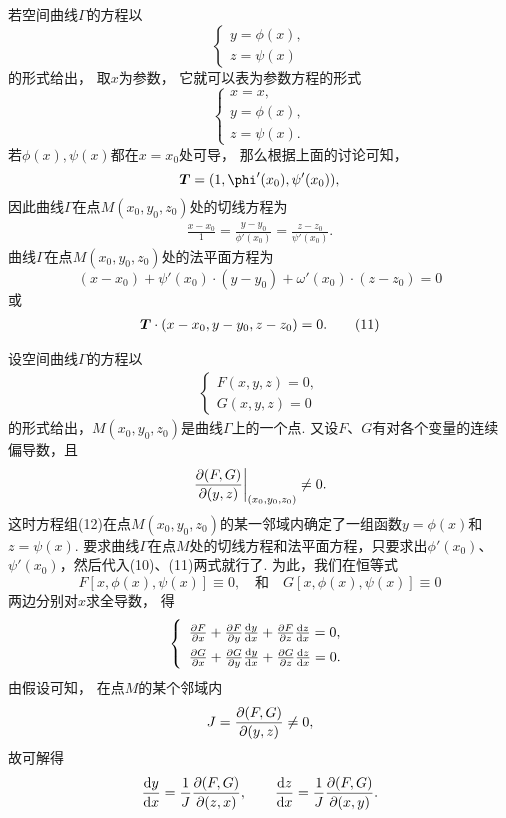 若空间曲线\(\Gamma\)的方程以\[
	\left\{ \begin{array}{l}
		y = \phi(x), \\
		z = \psi(x)
	\end{array} \right.
\]的形式给出，
取\(x\)为参数，
它就可以表为参数方程的形式\[
	\left\{ \begin{array}{l}
		x = x, \\
		y = \phi(x), \\
		z = \psi(x).
	\end{array} \right.
\]
若\(\phi(x),\psi(x)\)都在\(x=x_0\)处可导，
那么根据上面的讨论可知，\[
	\vb{T} = (1,\phi'(x_0),\psi'(x_0)),
\]
因此曲线\(\Gamma\)在点\(M(x_0,y_0,z_0)\)处的切线方程为
\begin{gather}
	\frac{x-x_0}{1}
	=\frac{y-y_0}{\phi'(x_0)}
	=\frac{z-z_0}{\psi'(x_0)}.
	\tag{10}
\end{gather}
曲线\(\Gamma\)在点\(M(x_0,y_0,z_0)\)处的法平面方程为\[
	(x-x_0) + \psi'(x_0) \cdot (y-y_0) + \omega'(x_0) \cdot (z-z_0) = 0
\]或\begin{gather}
	\boldsymbol{T}\cdot(x-x_0,y-y_0,z-z_0)=0.
	\tag{11}
\end{gather}

设空间曲线\(\Gamma\)的方程以\begin{gather}
\left\{ \begin{array}{l}
F(x,y,z)=0, \\
G(x,y,z)=0
\end{array} \right.
\tag{12}
\end{gather}的形式给出，\(M(x_0,y_0,z_0)\)是曲线\(\Gamma\)上的一个点.
又设\(F\)、\(G\)有对各个变量的连续偏导数，且\[
\eval{\jacobi{F,G}{y,z}}_{(x_0,y_0,z_0)} \neq 0.
\]这时方程组(12)在点\(M(x_0,y_0,z_0)\)的某一邻域内确定了一组函数\(y=\phi(x)\)和\(z=\psi(x)\).
要求曲线\(\Gamma\)在点\(M\)处的切线方程和法平面方程，只要求出\(\phi'(x_0)\)、\(\psi'(x_0)\)，然后代入(10)、(11)两式就行了.
为此，我们在恒等式\[
	F[x,\phi(x),\psi(x)] \equiv 0,
	\quad\text{和}\quad
	G[x,\phi(x),\psi(x)] \equiv 0
\]两边分别对\(x\)求全导数，
得\[
	\left\{ \def\arraystretch{1.5} \begin{array}{l}
		\pdv{F}{x} + \pdv{F}{y} \dv{y}{x} + \pdv{F}{z} \dv{z}{x} = 0, \\
		\pdv{G}{x} + \pdv{G}{y} \dv{y}{x} + \pdv{G}{z} \dv{z}{x} = 0.
	\end{array} \right.
\]
由假设可知，
在点\(M\)的某个邻域内\[
	J = \pdv{ (F,G) }{ (y,z) } \neq 0,
\]
故可解得\[
	\dv{y}{x} = \frac{1}{J} \pdv{ (F,G) }{ (z,x) },
	\qquad
	\dv{z}{x} = \frac{1}{J} \pdv{ (F,G) }{ (x,y) }.
\]

